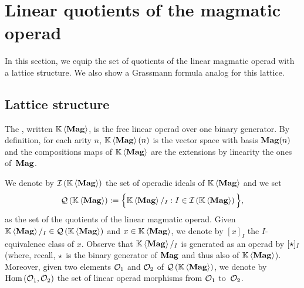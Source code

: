 \section{Linear quotients of the magmatic operad}
\label{sec:Magmatic_operads}
In this section, we equip the set of quotients of the linear magmatic
operad with a lattice structure. We also show a Grassmann formula
analog for this lattice.
\medbreak

\subsection{Lattice structure}
The , written $\KMag$, is the free linear
operad over one binary generator. By definition, for each arity $n$,
$\KMag(n)$ is the vector space with basis $\Mag(n)$ and the
compositions maps of $\KMag$ are the extensions by linearity the ones
of~$\Mag$.
\medbreak

We denote by $\IMag$ the set of operadic ideals of $\KMag$ and we set
\begin{equation} \label{equ:definition_of_QMag}
    \QMag := \Big\{\KMag/_I :  I\in\IMag\Big\},
\end{equation}
as the set of the quotients of the linear magmatic operad. Given
$\KMag/_I \in \QMag$ and $x \in \KMag$, we denote by $[x]_I$ the
$I$-equivalence class of $x$. Observe that $\KMag/_I$ is generated as an
operad by $[\Product]_I$ (where, recall, $\Product$ is the binary
generator of $\Mag$ and thus also of $\KMag$). Moreover, given two
elements $\Oca_1$ and $\Oca_2$ of $\QMag$, we denote by
$\Hom\left(\Oca_1,\Oca_2\right)$ the set of linear operad morphisms from
$\Oca_1$ to~$\Oca_2$.
\medbreak

